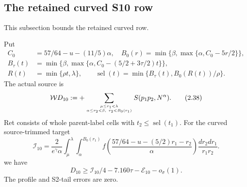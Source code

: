 \subsection{The retained curved S10 row}
\label{p2:sec:2.10}
This subsection bounds the retained curved row.
\begin{lemma}
Put
\[
\begin{aligned}
 C_0&=57/64-u-(11/5)\alpha,\quad
 B_0(r)=\min\{\beta,\max\{\alpha,C_0-5r/2\}\},\\
 B_\tau(t)&=\min\{\beta,\max\{\alpha,C_0-(5/2+3\tau/2)t\}\},\\
 R(t)&=\min\{\rho t,\lambda\},\qquad
 \operatorname{sel}(t)=\min\{B_\tau(t),B_0(R(t))/\rho\}.
\end{aligned}
\]
The actual source is
\[
 \mathcal W D_{10}:=+\sum_{\mu\le r_1<\lambda\atop\alpha\le r_2<\beta,\ r_2<B_0(r_1)}
 S(p_1p_2,N^\alpha).
 \tag{2.38}\label{p2:eq:2.38}
\]
Ret consists of whole parent-label cells with $t_2\le\operatorname{sel}(t_1)$.
For the curved source-trimmed target
\[
 \mathcal I_{10}=\frac{2}{e^\gamma\alpha}
 \int_\mu^\lambda\int_\alpha^{B_0(r_1)}
 f\!\left(\frac{57/64-u-(5/2)r_1-r_2}{\alpha}\right)
 \frac{dr_2dr_1}{r_1r_2}.
 \tag{2.39}\label{p2:eq:2.39}
\]
we have
\[
 D_{10}\ge\mathcal I_{10}/4-7.160\tau-\mathcal E_{10}-o_\sigma(1).
 \tag{2.40}\label{p2:eq:2.40}
\]
The profile and S2-tail errors are zero.
\end{lemma}
